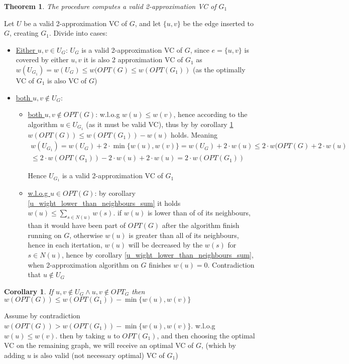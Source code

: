 \documentclass[11pt]{article}
\newtheorem{theorem}{Theorem}[section]
\newtheorem{corollary}{Corollary}[theorem]
\begin{document}
\begin{theorem}
The procedure computes a valid 2-approximation VC of $G_1$
\end{theorem}
Let $U$ be a valid 2-approximation VC of $G$, and let $\{u,v\}$ be the edge inserted to $G$, creating $G_1$. Divide into cases:
\begin{itemize}
    \item \underline{Either $u,v \in U_G$}: $U_G$ is a valid 2-approximation VC of $G$, since $e=\{u,v\}$ is covered by either $u,v$ it is also 2 approximation VC of $G_1$ as 
    $w(U_{G_1})=w(U_G) \le w(OPT(G) \le w(OPT(G_1))$ (as the optimally VC of $G_1$ is also VC of $G$)
    \item \underline{both $u,v \notin U_G$}:
        \begin{itemize}
            \item \underline{both $u,v \notin OPT(G)$}: w.l.o.g $w(u) \le w(v)$, hence according to the algorithm $u \in U_{G_1}$ (as it must be valid VC), thus by by corollary \ref{uv_notin_UG_OPTG} $w(OPT(G)) \le w(OPT(G_1)) - w(u)$ holds. Meaning
            \begin{align*}
            w(U_{G_1}) = w(U_G) + 2\cdot \min\{w(u), w(v)\} = w(U_G) + 2\cdot w(u) \le 2 \cdot w(OPT(G) + 2\cdot w(u) \\ \le 2 \cdot w(OPT(G_1)) - 2 \cdot w(u) + 2\cdot w(u) = 2 \cdot w(OPT(G_1))
            \end{align*}

            Hence $U_{G_1}$ is a valid 2-approximation VC of $G_1$
            
            \item \underline{w.l.o.g $u \in OPT(G)$}: by corollary \ref{u_wight_lower_than_neighbours_sum} it holds $w(u) \le \underset{s \in N(u)}{\sum} w(s)$. if $w(u)$ is lower than of of its neighbours, than it would have been part of $OPT(G)$ after the algorithm finish running on $G$, otherwise $w(u)$ is greater than all of its neighbours, hence in each itertation, $w(u)$ will be decreased by the $w(s)$ for $s\in N(u)$, hence by corollary  \ref{u_wight_lower_than_neighbours_sum}, when 2-approximation algorithm on $G$ finishes $w(u)=0$. Contradiction that $u \notin U_G$
        \end{itemize}
\end{itemize}


\begin{corollary}
If $u,v \notin U_G \land u,v \notin OPT_G$ then $w(OPT(G)) \le w(OPT(G_1)) - \min\{w(u), w(v)\}$
\label{uv_notin_UG_OPTG}
\end{corollary}
Assume by contradiction $w(OPT(G)) > w(OPT(G_1)) - \min\{w(u), w(v)\}$. w.l.o.g $w(u) \le w(v)$. then by taking $u$ to $OPT({G_1})$, and then choosing the optimal VC on the remaining graph, we will receive an optimal VC of $G$, (which by adding $u$ is also valid (not necessary optimal) VC of $G_1$)
\end{document}
